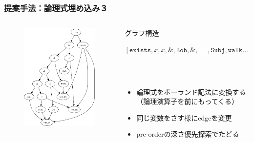 \documentclass[dvipdfmx,cjk]{beamer}
\newcommand{\LF}[1]{\ensuremath{\texttt{#1}}}
\begin{document}
\begin{frame}
\frametitle{提案手法：論理式埋め込み３}
\begin{columns}[t]
    \begin{column}{0.4\textwidth} %
        \begin{figure}[h]
        	\includegraphics[width=4cm]{graph.png}
                \label{fig:graph}
        \end{figure}
    \end{column}
    \begin{column}{0.6\textwidth} %
      \begin{block}{グラフ構造}
        \begin{center}
         $[\LF{exists},x,x,\&,\LF{Bob},\&,=,\LF{Subj},\LF{walk}...]$
         \end{center}
      \end{block}
      \\~\
      \begin{itemize}
        \item 論理式をポーランド記法に変換する\\（論理演算子を前にもってくる）
        \item 同じ変数をさす様にedgeを変更
        \item pre-orderの深さ優先探索でたどる
      \end{itemize}
    \end{column}
\end{columns}

\end{frame}




\end{document}
